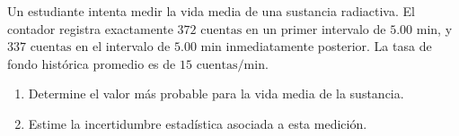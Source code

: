 \item Un estudiante intenta medir la vida media de una sustancia radiactiva. El contador registra exactamente $372\text{ cuentas}$ en un primer intervalo de $5.00\text{ min}$, y $337\text{ cuentas}$ en el intervalo de $5.00\text{ min}$ inmediatamente posterior. La tasa de fondo histórica promedio es de $15\text{ cuentas/min}$.
\begin{enumerate}
    \item Determine el valor más probable para la vida media de la sustancia.
    \item Estime la incertidumbre estadística asociada a esta medición.
\end{enumerate}